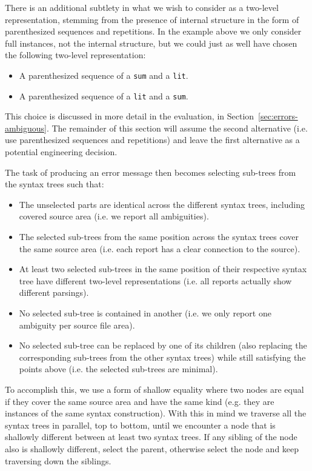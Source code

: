 \documentclass{kththesis}
\begin{document}
There is an additional subtlety in what we wish to consider as a two-level representation, stemming from the presence of internal structure in the form of parenthesized sequences and repetitions. In the example above we only consider full instances, not the internal structure, but we could just as well have chosen the following two-level representation:

\begin{itemize}
  \item A parenthesized sequence of a \texttt{sum} and a \texttt{lit}.
  \item A parenthesized sequence of a \texttt{lit} and a \texttt{sum}.
\end{itemize}

This choice is discussed in more detail in the evaluation, in Section~\ref{sec:errors-ambiguous}. The remainder of this section will assume the second alternative (i.e. use parenthesized sequences and repetitions) and leave the first alternative as a potential engineering decision.

The task of producing an error message then becomes selecting sub-trees from the syntax trees such that:

\begin{itemize}
  \item The unselected parts are identical across the different syntax trees, including covered source area (i.e. we report all ambiguities).
  \item The selected sub-trees from the same position across the syntax trees cover the same source area (i.e. each report has a clear connection to the source).
  \item At least two selected sub-trees in the same position of their respective syntax tree have different two-level representations (i.e. all reports actually show different parsings).
  \item No selected sub-tree is contained in another (i.e. we only report one ambiguity per source file area).
  \item No selected sub-tree can be replaced by one of its children (also replacing the corresponding sub-trees from the other syntax trees) while still satisfying the points above (i.e. the selected sub-trees are minimal).
\end{itemize}

To accomplish this, we use a form of shallow equality where two nodes are equal if they cover the same source area and have the same kind (e.g. they are instances of the same syntax construction). With this in mind we traverse all the syntax trees in parallel, top to bottom, until we encounter a node that is shallowly different between at least two syntax trees. If any sibling of the node also is shallowly different, select the parent, otherwise select the node and keep traversing down the siblings.
\end{document}
